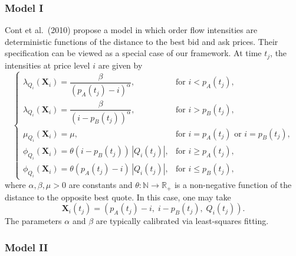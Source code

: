 \documentclass[11pt]{article}
\begin{document}
\subsubsection{Model I}

Cont et al.~(2010) propose a model in which order flow intensities are deterministic functions of the distance to the best bid and ask prices. Their specification can be viewed as a special case of our framework. At time $t_j$, the intensities at price level $i$ are given by
\begin{equation}
\left\{
\begin{array}{ll}
\lambda_{Q_i}(\boldsymbol{X}_i) = \dfrac{\beta}{(p_A(t_j) - i)^\alpha}, 
& \text{for } i < p_A(t_j), \\[10pt]
\lambda_{Q_i}(\boldsymbol{X}_i) = \dfrac{\beta}{(i - p_B(t_j))^\alpha}, 
& \text{for } i > p_B(t_j), \\[10pt]
\mu_{Q_i}(\boldsymbol{X}_i) = \mu, 
& \text{for } i = p_A(t_j) \text{ or } i = p_B(t_j), \\[10pt]
\phi_{Q_i}(\boldsymbol{X}_i) = \theta(i - p_B(t_j))\,|Q_i(t_j)|, 
& \text{for } i \geq p_A(t_j), \\[10pt]
\phi_{Q_i}(\boldsymbol{X}_i) = \theta(p_A(t_j) - i)\,|Q_i(t_j)|, 
& \text{for } i \leq p_B(t_j),
\end{array}
\right.
\end{equation}
where $\alpha,\beta,\mu>0$ are constants and $\theta:\mathbb{N}\to\mathbb{R}_+$ is a non-negative function of the distance to the opposite best quote. In this case, one may take
\[
\boldsymbol{X}_i(t_j)=(p_A(t_j)-i,\; i-p_B(t_j),\; Q_i(t_j)).
\]
The parameters $\alpha$ and $\beta$ are typically calibrated via least-squares fitting.

\subsubsection{Model II}
\end{document}
